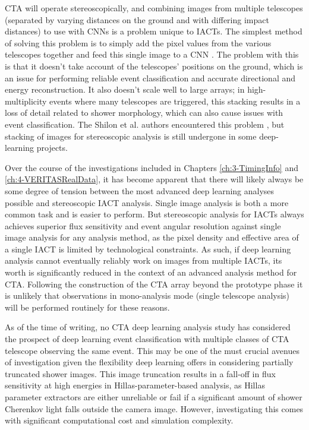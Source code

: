 CTA will operate stereoscopically, and combining images from multiple telescopes (separated by varying distances on the ground and with differing impact distances) to use with CNNs is a problem unique to IACTs. The simplest method of solving this problem is to simply add the pixel values from the various telescopes together and feed this single image to a CNN \cite{mangano}. The problem with this is that it doesn't take account of the telescopes' positions on the ground, which is an issue for performing reliable event classification and accurate directional and energy reconstruction. It also doesn't scale well to large arrays; in high-multiplicity events where many telescopes are triggered, this stacking results in a loss of detail related to shower morphology, which can also cause issues with event classification. The Shilon et al. authors encountered this problem \cite{Shilon}, but stacking of images for stereoscopic analysis is still undergone in some deep-learning projects.

Over the course of the investigations included in Chapters \ref{ch:3-TimingInfo} and \ref{ch:4-VERITASRealData}, it has become apparent that there will likely always be some degree of tension between the most advanced deep learning analyses possible and stereoscopic IACT analysis. Single image analysis is both a more common task and is easier to perform.  But stereoscopic analysis for IACTs always achieves superior flux sensitivity and event angular resolution against single image analysis for any analysis method, as the pixel density and effective area of a single IACT is limited by technological constraints. As such, if deep learning analysis cannot eventually reliably work on images from multiple IACTs, its worth is significantly reduced in the context of an advanced analysis method for CTA. Following the construction of the CTA array beyond the prototype phase it is unlikely that observations in mono-analysis mode (single telescope analysis) will be performed routinely for these reasons.

As of the time of writing, no CTA deep learning analysis study has considered the prospect of deep learning event classification with multiple classes of CTA telescope observing the same event. This may be one of the must crucial avenues of investigation given the flexibility deep learning offers in considering partially truncated shower images. This image truncation results in a fall-off in flux sensitivity at high energies in Hillas-parameter-based analysis, as Hillas parameter extractors are either unreliable or fail if a significant amount of shower Cherenkov light falls outside the camera image. However, investigating this comes with significant computational cost and simulation complexity.

